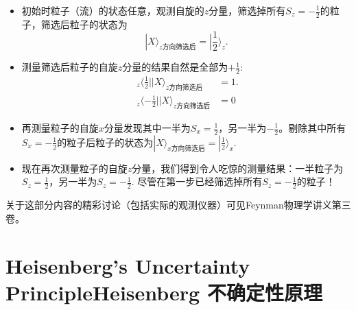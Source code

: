 \begin{itemize}
\item	初始时粒子（流）的状态任意，观测自旋的$z$分量，筛选掉所有$S_z = -\frac{1}{2}$的粒子，筛选后粒子的状态为
	\begin{equation}
		|X\rangle_{z\text{方向筛选后}} = |\frac{1}{2} \rangle_z.
	\label{equ8.58}
	\end{equation}
\item	测量筛选后粒子的自旋$z$分量的结果自然是全部为$+\frac{1}{2}$:
	\begin{align}
		\ _z\langle \frac{1}{2} || X \rangle_{z\text{方向筛选后}} &= 1.
	\label{equ8.59} \\
		\ _z \langle -\frac{1}{2} | |X \rangle_{z\text{方向筛选后}} &= 0
	\label{equ8.60}
	\end{align}
\item	再测量粒子的自旋$x$分量发现其中一半为$S_x = \frac{1}{2}$，另一半为$-\frac{1}{2}$。剔除其中所有$S_x = -\frac{1}{2}$的粒子后粒子的状态为$|X\rangle_{x\text{方向筛选后}} = |\frac{1}{2} \rangle_x$.
\item 	现在再次测量粒子的自旋$z$分量，我们得到令人吃惊的测量结果：一半粒子为$S_z = \frac{1}{2}$，另一半为$S_z = -\frac{1}{2}$. 尽管在第一步已经筛选掉所有$S_z = -\frac{1}{2}$的粒子！
\end{itemize}
关于这部分内容的精彩讨论（包括实际的观测仪器）可见Feynman物理学讲义第三卷。

\section[Heisenberg 不确定性原理]{Heisenberg’s Uncertainty PrincipleHeisenberg 不确定性原理}\label{sec8.6}

